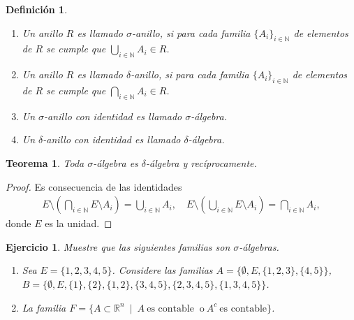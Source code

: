 \documentclass[twoside,12pt,a4 paper,openright]{book}
\newtheorem{teo}[claim]{Teorema}
\newtheorem{ejer}[claim]{Ejercicio}
\newtheorem{defi}[claim]{Definici\'on}
\begin{document}
\begin{defi} \ {} \begin{enumerate}
\item 
Un anillo $R$ es llamado $\sigma$-anillo, si para cada familia $\{A_i \}_{i\in \mathbb N}$ de elementos  de $R$ se cumple que $\bigcup_{i\in\mathbb N} A_i\in R$.

\item Un anillo $R$ es llamado $\delta$-anillo, si para cada familia $\{A_i \}_{i\in \mathbb N}$ de elementos  de $R$ se cumple que $\bigcap_{i\in\mathbb N} A_i\in R$.



\item Un $\sigma$-anillo  con identidad es llamado $\sigma$-\'algebra.    


\item Un $\delta$-anillo  con identidad es llamado $\delta$-\'algebra.  

\end{enumerate}

\end{defi}





\begin{teo}
Toda $\sigma$-\'algebra es $\delta$-\'algebra y rec\'iprocamente.
\end{teo}
\begin{proof}
Es consecuencia de las identidades 
\begin{align*}
E \setminus ( \bigcap_{i\in \mathbb N} E\setminus A_i ) = \bigcup_{i\in \mathbb N} A_i, \quad   
E \setminus ( \bigcup_{i\in \mathbb N} E\setminus A_i ) = \bigcap_{i\in \mathbb N} A_i,
\end{align*}
donde $E$ es la unidad.
\end{proof}




\begin{ejer}Muestre que las siguientes familias son $\sigma$-\'algebras. 
\begin{enumerate} 
\item Sea $E=\{1, 2, 3, 4,5\}$. Considere las familias $A = \{\emptyset, E,
\{1,2,3\}, \{4,5\}\}$, $ B = \{\emptyset , E, \{1\}, \{2\}, \{1,2\}, \{3,4,5\}, \{2,3,4,5\}, \{1,3,4,5\}     \}$.

\item   La familia
$ F = \{ A \subset \mathbb R^n  \ \mid \  A \ \textrm{es contable} \  \textrm{ o} \ A^c \ \textrm{es contable}\}$.




\end{enumerate}

\end{ejer}
\end{document}
